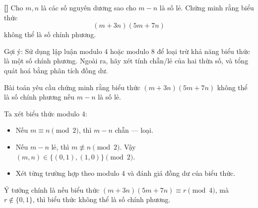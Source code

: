 \documentclass[../05-modular-arithmetic-a.tex]{subfiles}
\begin{document}
\begin{exercise*}\label{example:THA-2015-MO-P8}\textbf{[]}
    Cho \( m, n \) là các số nguyên dương sao cho \( m - n \) là số lẻ. Chứng minh rằng biểu thức
    \[
        (m + 3n)(5m + 7n)
    \]
    không thể là số chính phương.
\end{exercise*}

\begin{remark*}
    Gợi ý: Sử dụng lập luận modulo 4 hoặc modulo 8 để loại trừ khả năng biểu thức là một số chính phương.
    Ngoài ra, hãy xét tính chẵn/lẻ của hai thừa số, và tổng quát hoá bằng phân tích đồng dư.
\end{remark*}

\begin{story*}
    Bài toán yêu cầu chứng minh rằng biểu thức \( (m + 3n)(5m + 7n) \) không thể là số chính phương nếu \( m - n \) là số lẻ.

    Ta xét biểu thức modulo 4:
    \begin{itemize}[topsep=0pt, partopsep=0pt, itemsep=0pt]
        \item Nếu \( m \equiv n \pmod{2} \), thì \( m - n \) chẵn — loại.
        \item Nếu \( m - n \) lẻ, thì \( m \not\equiv n \pmod{2} \). Vậy \((m,n) \in \{(0,1), (1,0)\} \pmod{2}\).
        \item Xét từng trường hợp theo modulo 4 và đánh giá đồng dư của biểu thức.
    \end{itemize}

    Ý tưởng chính là nếu biểu thức \( (m + 3n)(5m + 7n) \equiv r \pmod{4} \), mà \( r \notin \{0,1\} \), thì biểu thức không thể là số chính phương.
\end{story*}
\end{document}
